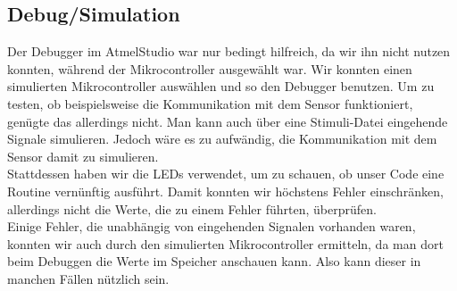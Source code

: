 \documentclass[]{article}
\begin{document}
\subsection{Debug/Simulation}
Der Debugger im AtmelStudio war nur bedingt hilfreich, da wir ihn nicht nutzen konnten, während der Mikrocontroller ausgewählt war. Wir konnten einen simulierten Mikrocontroller auswählen und so den Debugger benutzen. Um zu testen, ob beispielsweise die Kommunikation mit dem Sensor funktioniert, genügte das allerdings nicht. Man kann auch über eine Stimuli-Datei eingehende Signale simulieren. Jedoch wäre es zu aufwändig, die Kommunikation mit dem Sensor damit zu simulieren. \\Stattdessen haben wir die LEDs verwendet, um zu schauen, ob unser Code eine Routine vernünftig ausführt. Damit konnten wir höchstens Fehler einschränken, allerdings nicht die Werte, die zu einem Fehler führten, überprüfen. \\Einige Fehler, die unabhängig von eingehenden Signalen vorhanden waren, konnten wir auch durch den simulierten Mikrocontroller ermitteln, da man dort beim Debuggen die Werte im Speicher anschauen kann. Also kann dieser in manchen Fällen nützlich sein.
\end{document}
